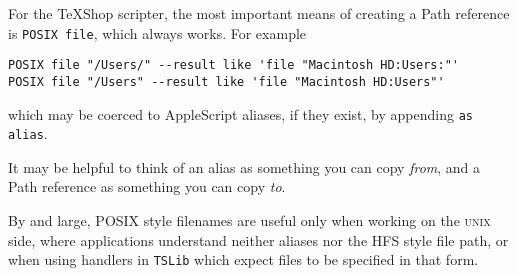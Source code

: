 \documentclass[11pt]{amsart}
\def\UNIX{\textsc{unix}\xspace}
\begin{document}
For the TeXShop scripter, the most important means of creating a Path reference is {\tt POSIX file}, which always works. For example
\begin{verbatim}
POSIX file "/Users/" --result like 'file "Macintosh HD:Users:"'
POSIX file "/Users" --result like 'file "Macintosh HD:Users"'
\end{verbatim}
which may be coerced to AppleScript aliases, if they exist, by appending {\tt as alias}.

It may be helpful to think of an alias as something you can copy \emph{from}, and a Path reference as something you can copy \emph{to}. 


By and large, POSIX style filenames are useful only when working on the \UNIX side, where applications understand neither aliases nor the HFS style file path, or when using handlers in {\tt TSLib} which expect files to be specified in that form.
\end{document}
